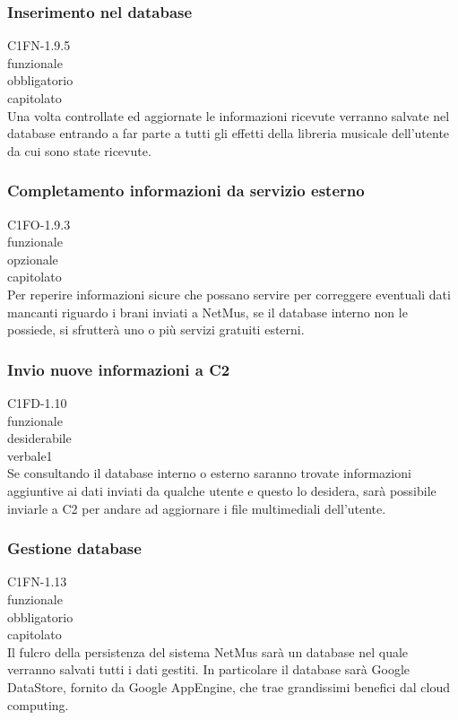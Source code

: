 \subsubsection*{Inserimento nel database}
 C1FN-1.9.5 \\
 funzionale \\
 obbligatorio \\
 capitolato \\
Una volta controllate ed aggiornate le informazioni ricevute verranno salvate
nel database entrando a far parte a tutti gli effetti della libreria musicale
dell'utente da cui sono state ricevute.

\subsubsection*{Completamento informazioni da servizio esterno}
 C1FO-1.9.3 \\
 funzionale \\
 opzionale \\
 capitolato \\
Per reperire informazioni sicure che possano servire per correggere eventuali
dati mancanti riguardo i brani inviati a NetMus, se il database interno non le
possiede, si sfrutter\`a uno o pi\`u servizi gratuiti esterni.

\subsubsection*{Invio nuove informazioni a C2}
 C1FD-1.10 \\
 funzionale \\
 desiderabile \\
 verbale1 \\
Se consultando il database interno o esterno saranno trovate informazioni
aggiuntive ai dati inviati da qualche utente e questo lo desidera, sar\`a
possibile inviarle a C2 per andare ad aggiornare i file multimediali
dell'utente.

\subsubsection*{Gestione database}
 C1FN-1.13 \\
 funzionale \\
 obbligatorio \\
 capitolato \\
Il fulcro della persistenza del sistema NetMus sar\`a un database nel quale
verranno salvati tutti i dati gestiti. In particolare il database sar\`a Google
DataStore, fornito da Google AppEngine, che trae grandissimi benefici
dal cloud computing.

